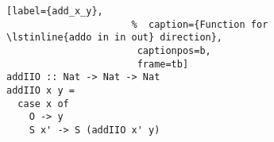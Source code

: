 \begin{figure}[!t]
  \centering
  \begin{minipage}{\columnwidth}
    \begin{lstlisting}[label={add_x_y},
                      %  caption={Function for \lstinline{addo in in out} direction},
                       captionpos=b,
                       frame=tb]
addIIO :: Nat -> Nat -> Nat
addIIO x y =
  case x of
    O -> y
    S x' -> S (addIIO x' y)
    \end{lstlisting}
  \end{minipage}
\end{figure}
